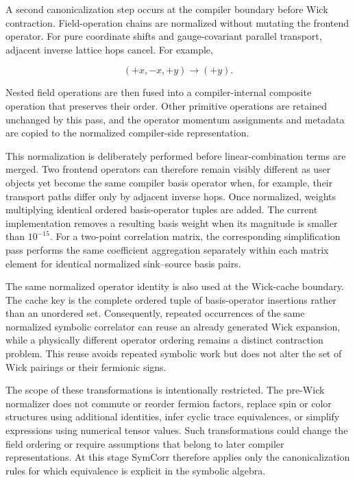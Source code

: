 \documentclass[11pt]{article}
\begin{document}
A second canonicalization step occurs at the compiler boundary before Wick
contraction. Field-operation chains are normalized without mutating the
frontend operator. For pure coordinate shifts and gauge-covariant parallel
transport, adjacent inverse lattice hops cancel. For example,

\begin{equation}
(+x,-x,+y)\longrightarrow(+y).
\label{eq:path_canonicalization}
\end{equation}

Nested field operations are then fused into a compiler-internal composite
operation that preserves their order. Other primitive operations are retained
unchanged by this pass, and the operator momentum assignments and metadata are
copied to the normalized compiler-side representation.

This normalization is deliberately performed before linear-combination terms
are merged. Two frontend operators can therefore remain visibly different as
user objects yet become the same compiler basis operator when, for example,
their transport paths differ only by adjacent inverse hops. Once normalized,
weights multiplying identical ordered basis-operator tuples are added. The
current implementation removes a resulting basis weight when its magnitude is
smaller than \(10^{-15}\). For a two-point correlation matrix, the corresponding
simplification pass performs the same coefficient aggregation separately within
each matrix element for identical normalized sink--source basis pairs.

The same normalized operator identity is also used at the Wick-cache boundary.
The cache key is the complete ordered tuple of basis-operator insertions rather
than an unordered set. Consequently, repeated occurrences of the same
normalized symbolic correlator can reuse an already generated Wick expansion,
while a physically different operator ordering remains a distinct contraction
problem. This reuse avoids repeated symbolic work but does not alter the set of
Wick pairings or their fermionic signs.

The scope of these transformations is intentionally restricted. The pre-Wick
normalizer does not commute or reorder fermion factors, replace spin or color
structures using additional identities, infer cyclic trace equivalences, or
simplify expressions using numerical tensor values. Such transformations could
change the field ordering or require assumptions that belong to later compiler
representations. At this stage SymCorr therefore applies only the
canonicalization rules for which equivalence is explicit in the symbolic
algebra.
\end{document}
